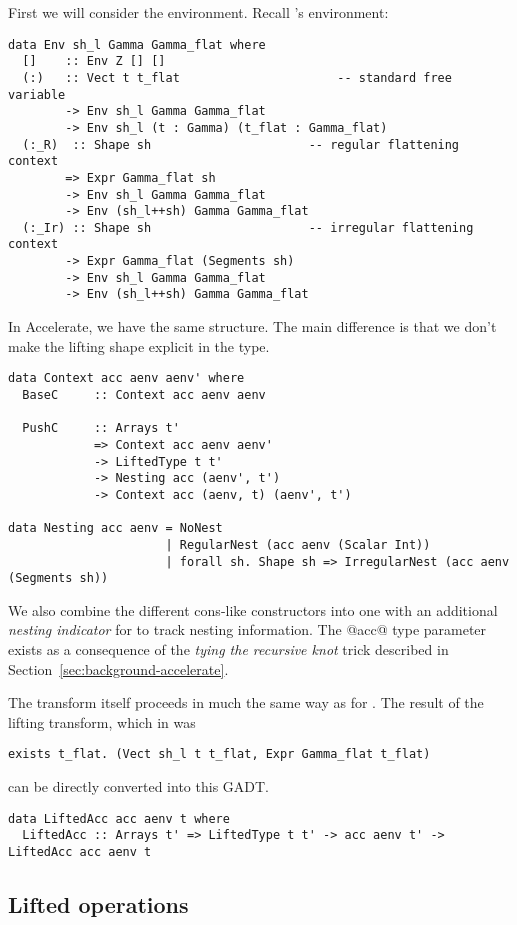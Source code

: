 First we will consider the environment. Recall \ndp{}'s environment:
%
\begin{lstlisting}[style=ndp]
data Env sh_l Gamma Gamma_flat where
  []    :: Env Z [] []
  (:)   :: Vect t t_flat                      -- standard free variable
        -> Env sh_l Gamma Gamma_flat
        -> Env sh_l (t : Gamma) (t_flat : Gamma_flat)
  (:_R)  :: Shape sh                      -- regular flattening context
        => Expr Gamma_flat sh
        -> Env sh_l Gamma Gamma_flat
        -> Env (sh_l++sh) Gamma Gamma_flat
  (:_Ir) :: Shape sh                      -- irregular flattening context
        -> Expr Gamma_flat (Segments sh)
        -> Env sh_l Gamma Gamma_flat
        -> Env (sh_l++sh) Gamma Gamma_flat
\end{lstlisting}
%
In Accelerate, we have the same structure. The main difference is that we don't make the lifting shape explicit in the type.
%
\begin{lstlisting}
data Context acc aenv aenv' where
  BaseC     :: Context acc aenv aenv

  PushC     :: Arrays t'
            => Context acc aenv aenv'
            -> LiftedType t t'
            -> Nesting acc (aenv', t')
            -> Context acc (aenv, t) (aenv', t')

data Nesting acc aenv = NoNest
                      | RegularNest (acc aenv (Scalar Int))
                      | forall sh. Shape sh => IrregularNest (acc aenv (Segments sh))
\end{lstlisting}
%
We also combine the different cons-like constructors into one with an additional \emph{nesting indicator} for to track nesting information. The @acc@ type parameter exists as a consequence of the \emph{tying the recursive knot} trick described in Section~\ref{sec:background-accelerate}.

The transform itself proceeds in much the same way as for \ndp{}. The result of the lifting transform, which in \ndp{} was
%
\begin{lstlisting}[style=ndp]
exists t_flat. (Vect sh_l t t_flat, Expr Gamma_flat t_flat)
\end{lstlisting}
%
can be directly converted into this GADT.
%
\begin{lstlisting}
data LiftedAcc acc aenv t where
  LiftedAcc :: Arrays t' => LiftedType t t' -> acc aenv t' -> LiftedAcc acc aenv t
\end{lstlisting}
%

\subsection{Lifted operations}

